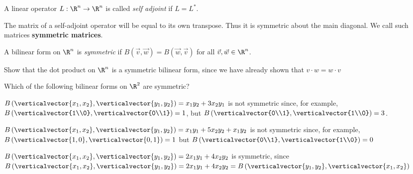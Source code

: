 \documentclass{ximera}
\begin{document}
		\begin{definition}
			A linear operator $L:\R^n \to \R^n$ is called \textit{self adjoint} if $L = L^*$.
		\end{definition}
		
		\begin{definition}
			The matrix of a self-adjoint operator will be equal to its own transpose.  Thus it is symmetric about the main diagonal.  We call such matrices \textbf{symmetric matrices}.
		\end{definition}

\begin{definition}
	A bilinear form on $\R^n$ is \textit{symmetric} if $B(\vec{v},\vec{w}) = B(\vec{w},\vec{v})$ for all $\vec{v},\vec{w} \in \R^n$.
\end{definition}

\begin{example}
	Show that the dot product on $\R^n$ is a symmetric bilinear form, since we have already shown that $v \cdot w = w \cdot v$
\end{example}

\begin{question}
	Which of the following bilinear forms on $\R^2$ are symmetric?
		\begin{solution}
			\begin{hint}
				$B\left(\verticalvector{x_1,x_2},\verticalvector{y_1,y_2}\right) = x_1y_2+3x_2y_1$ is not symmetric since, for example,
				$B\left( \verticalvector{1\\0},\verticalvector{0\\1}\right) = 1$, but $B\left( \verticalvector{0\\1},\verticalvector{1\\0}\right) = 3$.
			\end{hint}
			\begin{hint}
				$B\left(\verticalvector{x_1,x_2},\verticalvector{y_1,y_2}\right) = x_1y_1+5x_2y_2+x_1y_2$ is not symmetric since, for example,
				$B\left(\verticalvector{1,0},\verticalvector{0,1}\right) = 1$ but  $B\left( \verticalvector{0\\1},\verticalvector{1\\0}\right) = 0$
			\end{hint}
			\begin{hint}
				$B\left(\verticalvector{x_1,x_2},\verticalvector{y_1,y_2}\right) = 2x_1y_1+4x_2y_2$ is symmetric, since
				$B\left(\verticalvector{x_1,x_2},\verticalvector{y_1,y_2}\right) = 2x_1y_1+4x_2y_2 = B\left(\verticalvector{y_1,y_2}, \verticalvector{x_1,x_2}\right) $
			\end{hint}
			\begin{multiple-choice}
			\end{multiple-choice}
		\end{solution}
\end{question}
\end{document}
